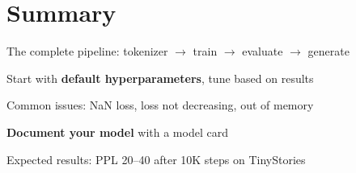 \section{Summary}

\begin{summary}
    \item The complete pipeline: tokenizer $\to$ train $\to$ evaluate $\to$ generate
    \item Start with \textbf{default hyperparameters}, tune based on results
    \item Common issues: NaN loss, loss not decreasing, out of memory
    \item \textbf{Document your model} with a model card
    \item Expected results: PPL 20--40 after 10K steps on TinyStories
\end{summary}
